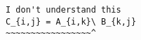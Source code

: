 \begin{verbatim}
I don't understand this
C_{i,j} = A_{i,k}\ B_{k,j}
~~~~~~~~~~~~~~~~~^
\end{verbatim}
